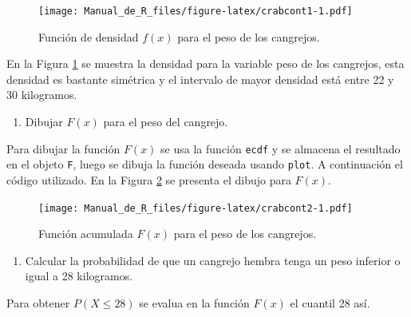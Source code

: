 \documentclass[10pt,]{krantz}
\makeatletter
\newenvironment{Shaded}{\begin{snugshade}}{\end{snugshade}}
\newcommand{\KeywordTok}[1]{\textcolor[rgb]{0.13,0.29,0.53}{\textbf{{#1}}}}
\newcommand{\DataTypeTok}[1]{\textcolor[rgb]{0.13,0.29,0.53}{{#1}}}
\newcommand{\DecValTok}[1]{\textcolor[rgb]{0.00,0.00,0.81}{{#1}}}
\newcommand{\FloatTok}[1]{\textcolor[rgb]{0.00,0.00,0.81}{{#1}}}
\newcommand{\StringTok}[1]{\textcolor[rgb]{0.31,0.60,0.02}{{#1}}}
\newcommand{\NormalTok}[1]{{#1}}
\providecommand{\tightlist}{%
  \setlength{\itemsep}{0pt}\setlength{\parskip}{0pt}}
\newenvironment{kframe}{%
\medskip{}
\setlength{\fboxsep}{.8em}
 \def\at@end@of@kframe{}%
 \ifinner\ifhmode%
  \def\at@end@of@kframe{\end{minipage}}%
  \begin{minipage}{\columnwidth}%
 \fi\fi%
 \def\FrameCommand##1{\hskip\@totalleftmargin \hskip-\fboxsep
 \colorbox{shadecolor}{##1}\hskip-\fboxsep
     \hskip-\linewidth \hskip-\@totalleftmargin \hskip\columnwidth}%
 \MakeFramed {\advance\hsize-\width
   \@totalleftmargin\z@ \linewidth\hsize
   \@setminipage}}%
 {\par\unskip\endMakeFramed%
 \at@end@of@kframe}
\renewenvironment{Shaded}{\begin{kframe}}{\end{kframe}}
\makeatother
\begin{document}
\begin{figure}[htbp]
\centering
\texttt{[image: Manual\_de\_R\_files/figure-latex/crabcont1-1.pdf]}
\caption{\label{fig:crabcont1}Función de densidad \(f(x)\) para el peso de
los cangrejos.}
\end{figure}

En la Figura \ref{fig:crabcont1} se muestra la densidad para la variable
peso de los cangrejos, esta densidad es bastante simétrica y el
intervalo de mayor densidad está entre 22 y 30 kilogramos.

\begin{enumerate}
\def\labelenumi{\arabic{enumi})}
\setcounter{enumi}{1}
\tightlist
\item
  Dibujar \(F(x)\) para el peso del cangrejo.
\end{enumerate}

Para dibujar la función \(F(x)\) se usa la función \texttt{ecdf} y se
almacena el resultado en el objeto \texttt{F}, luego se dibuja la
función deseada usando \texttt{plot}. A continuación el código
utilizado. En la Figura \ref{fig:crabcont2} se presenta el dibujo para
\(F(x)\).

\begin{Shaded}
\end{Shaded}

\begin{figure}[htbp]
\centering
\texttt{[image: Manual\_de\_R\_files/figure-latex/crabcont2-1.pdf]}
\caption{\label{fig:crabcont2}Función acumulada \(F(x)\) para el peso de los
cangrejos.}
\end{figure}

\begin{enumerate}
\def\labelenumi{\arabic{enumi})}
\setcounter{enumi}{2}
\tightlist
\item
  Calcular la probabilidad de que un cangrejo hembra tenga un peso
  inferior o igual a 28 kilogramos.
\end{enumerate}

Para obtener \(P(X \leq 28)\) se evalua en la función \(F(x)\) el
cuantil 28 así.
\end{document}

